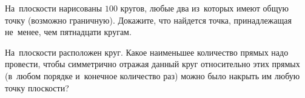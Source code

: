 \begin{problems}
\item
На~плоскости нарисованы $100$ кругов, любые два из~которых имеют общую точку
(возможно граничную).
Докажите, что найдется точка, принадлежащая не~менее, чем пятнадцати кругам.

\item
На~плоскости расположен круг.
Какое наименьшее количество прямых надо провести, чтобы симметрично отражая
данный круг относительно этих прямых (в~любом порядке и~конечное количество
раз) можно было накрыть им любую точку плоскости?

\end{problems}

